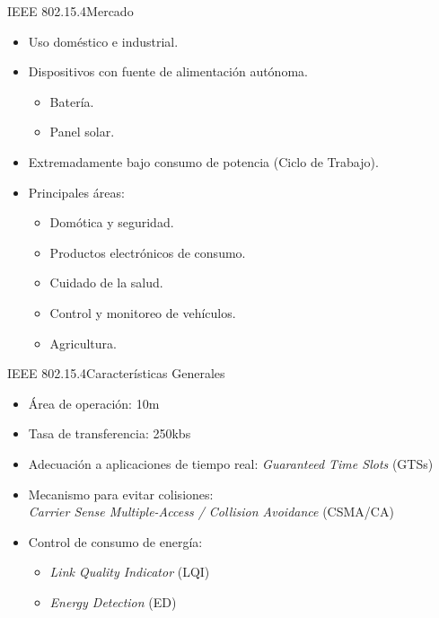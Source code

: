 \documentclass[aspectratio=169, handout]{beamer}
\begin{document}
\begin{frame}{IEEE 802.15.4}{Mercado}
	\begin{itemize}
		\item Uso doméstico e industrial.
		\vspace{5px}
		\item Dispositivos con fuente de alimentación autónoma.
		\begin{itemize}
			\item Batería.
			\item Panel solar.
		\end{itemize}
		\vspace{5px}
		\item Extremadamente bajo consumo de potencia (Ciclo de Trabajo).
		\vspace{5px}
		\item Principales áreas:
		\begin{itemize}
			\item Domótica y seguridad.
			\item Productos electrónicos de consumo.
			\item Cuidado de la salud.
			\item Control y monitoreo de vehículos.
			\item Agricultura.
		\end{itemize}
	\end{itemize}
	
\end{frame}

\begin{frame}{IEEE 802.15.4}{Características Generales}
	
	\begin{itemize}
		\item Área de operación: 10m
		\vspace{5px}
		\item Tasa de transferencia: 250kbs
		\vspace{5px}
		\item Adecuación a aplicaciones de tiempo real: \textit{Guaranteed Time Slots} (GTSs)
		\vspace{5px}
		\item Mecanismo para evitar colisiones:\\ \textit{Carrier Sense Multiple-Access / Collision Avoidance} (CSMA/CA)
		\vspace{5px}
		\item Control de consumo de energía: 
		\begin{itemize}
			\item \textit{Link Quality Indicator} (LQI)
			\item \textit{Energy Detection} (ED)
		\end{itemize}
	\end{itemize}
	
\end{frame}
\end{document}
